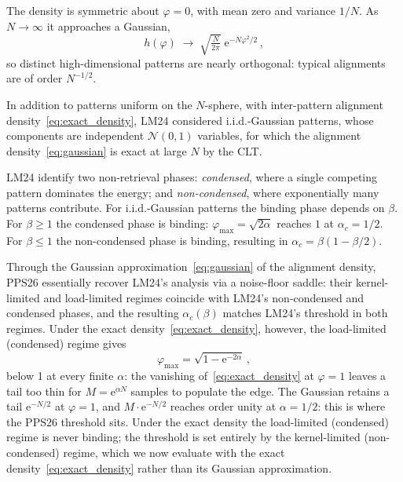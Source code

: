 \documentclass[letterpaper]{article} %
\newcommand{\e}{{\mathrm{e}}}
\newcommand{\Bnet}{\beta}
\begin{document}
The density is symmetric about $\varphi=0$, with mean zero and variance $1/N$. As $N\to\infty$ it approaches a Gaussian,
\begin{equation}
    h(\varphi)\;\longrightarrow \;\sqrt{\tfrac{N}{2\pi}} \; \e^{-N\varphi^2/2}\,,
    \label{eq:gaussian} 
\end{equation}
so distinct high-dimensional patterns are nearly orthogonal: typical alignments are of order $N^{-1/2}$. 

In addition to patterns uniform on the $N$-sphere, with inter-pattern alignment density~\eqref{eq:exact_density}, LM24 considered i.i.d.-Gaussian patterns, whose components are independent $\mathcal N(0,1)$ variables, for which the alignment density~\eqref{eq:gaussian} is exact at large $N$ by the CLT. 

LM24 identify two non-retrieval phases: \textit{condensed}, where a single competing pattern dominates the energy; and \textit{non-condensed}, where exponentially many patterns contribute. For i.i.d.-Gaussian patterns the binding phase depends on $\Bnet$. For $\Bnet \geq 1$ the condensed phase is binding: $\varphi_{\max} = \sqrt{2\alpha}$ reaches $1$ at $\alpha_c = 1/2$. For $\Bnet \leq 1$ the non-condensed phase is binding, resulting in $\alpha_c = \Bnet(1 - \Bnet/2)$.

Through the Gaussian approximation~\eqref{eq:gaussian} of the alignment density, PPS26 essentially recover LM24's analysis via a noise-floor saddle: their kernel-limited and load-limited regimes coincide with LM24's non-condensed and condensed phases, and the resulting $\alpha_c(\Bnet)$ matches LM24's threshold in both regimes. Under the exact density~\eqref{eq:exact_density}, however, the load-limited (condensed) regime gives
\begin{equation}
    \varphi_{\max} = \sqrt{1 - \e^{-2\alpha}}\,,
    \label{eq:varphi_max}
\end{equation}
below 1 at every finite $\alpha$: the vanishing of~\eqref{eq:exact_density} at $\varphi = 1$ leaves a tail too thin for $M = \e^{\alpha N}$ samples to populate the edge. The Gaussian retains a tail $\e^{-N/2}$ at $\varphi = 1$, and $M \cdot \e^{-N/2}$ reaches order unity at $\alpha = 1/2$: this is where the PPS26 threshold sits. Under the exact density the load-limited (condensed) regime is never binding; the threshold is set entirely by the kernel-limited (non-condensed) regime, which we now evaluate with the exact density~\eqref{eq:exact_density} rather than its Gaussian approximation.
\end{document}
